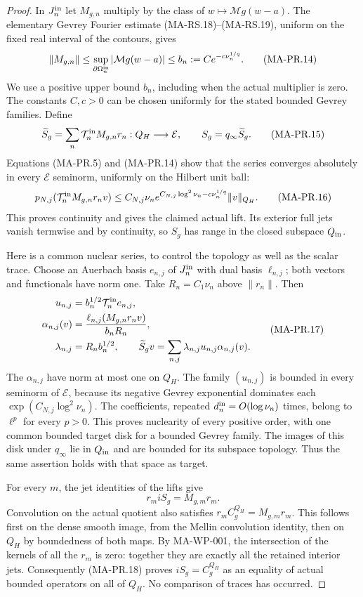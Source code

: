 \begin{proof}
In $J_n^{\rm in}$ let $M_{g,n}$ multiply by the class
of $w\mapsto\mathcal Mg(w-a)$.
The elementary Gevrey Fourier estimate (MA-RS.18)--(MA-RS.19),
uniform on the fixed real interval of the contours, gives
\[
 \|M_{g,n}\|\le
   \sup_{\partial\Omega_n^{\rm in}}|\mathcal Mg(w-a)|
       \le b_n:=C e^{-c\nu_n^{1/q}} .
\tag{MA-PR.14}
\]
We use a positive upper bound $b_n$, including when the
actual multiplier is zero.  The constants $C,c>0$ can
be chosen uniformly for the stated bounded Gevrey families.
Define
\[
 \widetilde S_g
    =\sum_n\mathcal T_n^{\rm in}M_{g,n}r_n:
                        Q_H\longrightarrow\mathcal E,
       \qquad S_g=q_\infty\widetilde S_g .
\tag{MA-PR.15}
\]
Equations (MA-PR.5) and (MA-PR.14) show that the series
converges absolutely in every $\mathcal E$ seminorm,
uniformly on the Hilbert unit ball:
\[
 p_{N,j}(\mathcal T_n^{\rm in}M_{g,n}r_n v)
 \le C_{N,j}\nu_n
       e^{C_{N,j}\log^2\nu_n-c\nu_n^{1/q}}\|v\|_{Q_H}.
\tag{MA-PR.16}
\]
This proves continuity and gives the claimed actual lift.
Its exterior full jets vanish termwise and by continuity,
so $S_g$ has range in the closed subspace $Q_{\rm in}$.

Here is a common nuclear series, to control the topology
as well as the scalar trace.  Choose an Auerbach basis
$e_{n,j}$ of $J_n^{\rm in}$ with dual basis $\ell_{n,j}$;
both vectors and functionals have norm one.  Take
$R_n=C_1\nu_n$ above $\|r_n\|$.  Then
\[
\begin{aligned}
 u_{n,j}&=b_n^{1/2}\mathcal T_n^{\rm in}e_{n,j},\\
 \alpha_{n,j}(v)&=
       \frac{\ell_{n,j}(M_{g,n}r_nv)}{b_nR_n},\\
 \lambda_{n,j}&=R_n b_n^{1/2},\qquad
 \widetilde S_gv=\sum_{n,j}
                       \lambda_{n,j}u_{n,j}\alpha_{n,j}(v).
\end{aligned}
\tag{MA-PR.17}
\]
The $\alpha_{n,j}$ have norm at most one on $Q_H$.
The family $(u_{n,j})$ is bounded in every seminorm of
$\mathcal E$, because its negative Gevrey exponential
dominates each $\exp(C_{N,j}\log^2\nu_n)$.
The coefficients, repeated $d_n^{\rm in}=O(\log\nu_n)$
times, belong to $\ell^p$ for every $p>0$.
This proves nuclearity of every positive order, with
one common bounded target disk for a bounded Gevrey
family.  The images of this disk under $q_\infty$ lie
in $Q_{\rm in}$ and are bounded for its subspace
topology.  Thus the same assertion holds with that
space as target.

For every $m$, the jet identities of the lifts give
\[
       r_m i S_g=M_{g,m}r_m.
\tag{MA-PR.18}
\]
Convolution on the actual quotient also satisfies
$r_m C_g^{Q_H}=M_{g,m}r_m$.
This follows first on the dense smooth image, from
the Mellin convolution identity, then on $Q_H$ by
boundedness of both maps.
By MA-WP-001, the intersection of the kernels of
all the $r_m$ is zero: together they are exactly all
the retained interior jets.
Consequently (MA-PR.18) proves
$i S_g=C_g^{Q_H}$ as an equality of actual bounded
operators on all of $Q_H$.
No comparison of traces has occurred.


\end{proof}
